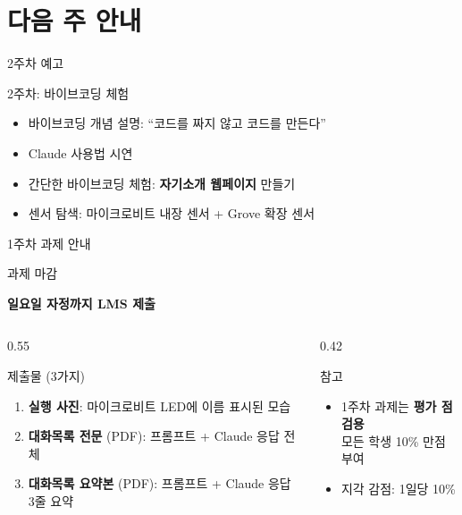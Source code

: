 \documentclass[aspectratio=169, 11pt]{beamer}
\begin{document}
\section{다음 주 안내}

\begin{frame}{2주차 예고}
\begin{block}{2주차: 바이브코딩 체험}
\begin{itemize}
    \item 바이브코딩 개념 설명: ``코드를 짜지 않고 코드를 만든다''
    \item Claude 사용법 시연
    \item 간단한 바이브코딩 체험: \textbf{자기소개 웹페이지} 만들기
    \item 센서 탐색: 마이크로비트 내장 센서 + Grove 확장 센서
\end{itemize}
\end{block}
\end{frame}

\begin{frame}{1주차 과제 안내}
\begin{alertblock}{과제 마감}
\begin{center}
\large\bfseries
일요일 자정까지 LMS 제출
\end{center}
\end{alertblock}

\begin{columns}[T, totalwidth=\textwidth]
\begin{column}{0.55\textwidth}
\begin{exampleblock}{제출물 (3가지)}
\small
\begin{enumerate}
    \item \textbf{실행 사진}: 마이크로비트 LED에 이름 표시된 모습
    \item \textbf{대화목록 전문} (PDF): 프롬프트 + Claude 응답 전체
    \item \textbf{대화목록 요약본} (PDF): 프롬프트 + Claude 응답 3줄 요약
\end{enumerate}
\end{exampleblock}
\end{column}
\hfill
\begin{column}{0.42\textwidth}
\begin{block}{참고}
\small
\begin{itemize}
    \item 1주차 과제는 \textbf{평가 점검용}\\모든 학생 10\% 만점 부여
    \item 지각 감점: 1일당 10\%
\end{itemize}
\end{block}
\end{column}
\end{columns}
\end{frame}
\end{document}
